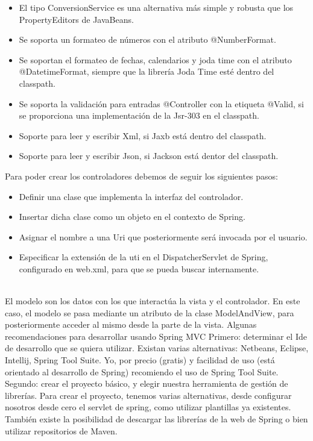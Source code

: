 \begin{itemize}
\begin{itemize}
			\item El tipo ConversionService es una alternativa más simple y robusta que los PropertyEditors de JavaBeans.
			\item Se soporta un formateo de números con el atributo @NumberFormat.
			\item Se soportan el formateo de fechas, calendarios y joda time con el atributo @DatetimeFormat, siempre que la librería Joda Time esté dentro del classpath.
			\item Se soporta la validación para entradas @Controller con la etiqueta @Valid, si se proporciona una implementación de la Jsr-303 en el classpath.
			\item Soporte para leer y escribir Xml, si Jaxb está dentro del classpath.
			\item Soporte para leer y escribir Json, si Jackson está dentor del classpath.
		\end{itemize}
		Para poder crear los controladores debemos de seguir los siguientes pasos:
		\begin{itemize}
			\item Definir una clase que implementa la interfaz del controlador.
			\item Insertar dicha clase como un objeto en el contexto de Spring.
			\item Asignar el nombre a una Uri que posteriormente será invocada por el usuario.
			\item Especificar la extensión de la uti en el DispatcherServlet de Spring, configurado en web.xml, para que se pueda buscar internamente.
		\end{itemize}
		\\
		El modelo son los datos con los que interactúa la vista y el controlador. En este caso, el modelo se pasa mediante un atributo de la clase ModelAndView, para posteriormente acceder al mismo desde la parte de la vista. \cite{introspring}
		Algunas recomendaciones para desarrollar usando Spring MVC
		Primero: determinar el Ide de desarrollo que se quiera utilizar. Existan varias alternativas: Netbeans, Eclipse, Intellij, Spring Tool Suite. Yo, por precio (gratis) y facilidad de uso (está orientado al desarrollo de Spring) recomiendo el uso de Spring Tool Suite. \\
		
		Segundo: crear el proyecto básico, y elegir nuestra herramienta de gestión de librerías. Para crear el proyecto, tenemos varias alternativas, desde configurar nosotros desde cero el servlet de spring, como utilizar plantillas ya existentes. También existe la posibilidad de descargar las librerías de la web de Spring o bien utilizar repositorios de Maven.\\
		

\end{itemize}
